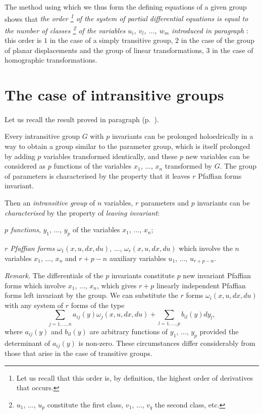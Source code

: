 \somespace

The method using which we thus form the defining equations of a given group shows that \emph{the order \footnote{Let us recall that this order is, by definition, the highest order of derivatives that occurs.} of the system of partial differential equations is equal to the number of classes \footnote{$u_{1}$, $\dots$, $u_{p}$ constitute the first class, $v_{1}$, $\dots$, $v_{q}$ the second class, etc.} of the variables $u_{i}$, $v_{l}$, $\dots$, $w_{m}$ introduced in paragraph} : this order is $1$ in the case of a simply transitive group, $2$ in the case of the group of planar displacements and the group of linear transformations, $3$ in the case of homographic transformations.

\section{The case of intransitive groups}
\label{sec:case-intr-groups}

\paragraph{}
\label{sec:114}
Let us recall the result proved in paragraph  (p.~\pageref{sec:103}).

Every intransitive group $G$ with $p$ invariants can be prolonged holoedrically in a way to obtain a group similar to the parameter group, which is itself prolonged  by adding $p$ variables transformed identically, and these $p$ new variables  can be considered as $p$ functions of the variables $x_{1}$, $\dots$, $x_{n}$ transformed by $G$. The group of parameters is characterised by the property that it leaves $r$ Pfaffian forms invariant.

Then an \emph{intransitive group} of $n$ variables, $r$ parameters and $p$ invariants can be \emph{characterised} by the property of \emph{leaving invariant}:

\somespace

\emph{$p$ functions}, $y_{1}$, $\dots$, $y_{p}$ of the variables $x_{1}$, $\dots$, $x_{n}$;

\emph{$r$ Pfaffian forms} $\omega_{1}(x,u,dx,du)$, $\dots$, $\omega_{r}(x,u,dx,du)$ which involve the $n$ variables $x_{1}$, $\dots$, $x_{n}$ and $r+p-n$ auxiliary variables $u_{1}$, $\dots$, $u_{r+p-n}$.

\somespace

\emph{Remark.} The differentials of the $p$ invariants constitute $p$ new invariant Pfaffian forms which involve $x_{1}$, $\dots$, $x_{n}$, which gives $r+p$ linearly independent Pfaffian forms left invariant by the group. We can substitute the $r$ forms $\omega_{i}(x,u,dx,du)$ with any system of $r$ forms of the type
\[
\sum_{j=1,\dots,n}a_{ij}(y)\omega_{j}(x,u,dx,du)+\sum_{l=1,\dots,p}b_{il}(y)dy_{l},
\]
where $a_{ij}(y)$ and $b_{il}(y)$ are arbitrary functions of $y_{1}$, $\dots$, $y_{p}$ provided the determinant of $a_{ij}(y)$ is non-zero. These circumstances differ considerably from those that arise in the case of transitive groups.

